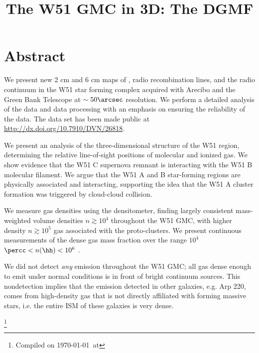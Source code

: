 

\title{The W51 GMC in 3D: The DGMF}




%

\section{Abstract}
We present new 2 cm and 6 cm maps of \formaldehyde, radio recombination lines,
and the radio continuum in the W51 star forming complex acquired with Arecibo
and the Green Bank Telescope at $\sim50\arcsec$ resolution.
We perform a detailed analysis of the data and data processing with an emphasis on
ensuring the reliability of the data.
The data set has been made public at \url{http://dx.doi.org/10.7910/DVN/26818}.

We present an analysis of the three-dimensional structure of the W51 region,
determining the relative line-of-sight positions of molecular and ionized gas.
We show evidence that the W51 C supernova remnant is interacting with the W51 B
molecular filament.
We argue that the W51 A and B star-forming regions are physically associated and
interacting, supporting the idea that the W51 A cluster formation was triggered
by cloud-cloud collision.

We measure gas densities using the \formaldehyde densitometer, finding largely
consistent mass-weighted volume densities $n\gtrsim10^4$ \percc throughout the
W51 GMC, with higher density $n\gtrsim10^5$ \percc gas associated with the
proto-clusters.  We present continuous measurements of the dense gas mass
fraction over the range $10^4$ $\percc< n(\hh) < 10^6$ \percc.

We did not detect \emph{any} \formaldehyde emission throughout the W51 GMC; all
gas dense enough to emit under normal conditions is in front of bright
continuum sources.  This nondetection implies that the \formaldehyde emission
detected in other galaxies, e.g. Arp 220, comes from high-density gas that is
not directly affiliated with forming massive stars, i.e. the entire ISM of
these galaxies is very dense.


\footnote{Compiled on \today\ at \currenttime}


